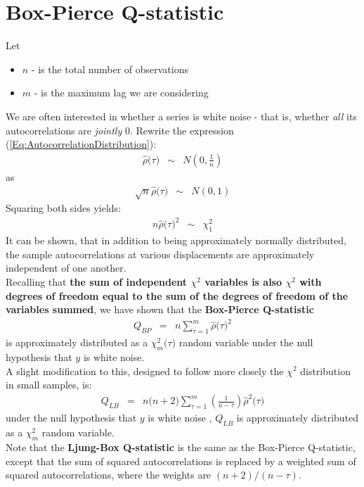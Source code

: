 \section{Box-Pierce Q-statistic}
Let
\begin{itemize}
	\item $n$ - is the total number of observations
	\item $m$ - is the maximum lag we are considering 
\end{itemize}
We are often interested in whether a series is white noise - that is, whether \textit{all} its autocorrelations are \textit{jointly} 0. Rewrite the expression (\ref{Eq:AutocorrelationDistribution}):
\begin{eqnarray}
	\nonumber
	\hat{\rho}\big(\tau\big) &\sim& N\left(0, \frac{1}{n}\right)
\end{eqnarray}
as
\begin{eqnarray}
	\sqrt{n}\hat{\rho}\big(\tau\big) &\sim& N\left(0, 1\right)
\end{eqnarray}
Squaring both sides yields:
\begin{eqnarray}
	n\hat{\rho}\big(\tau\big)^{2} &\sim& \chi_{1}^{2}
\end{eqnarray}
It can be shown, that in addition to being approximately normally distributed, the sample autocorrelations at various displacements are approximately independent of one another.\\
Recalling that \textbf{\color{blue}the sum of independent $\chi^{2}$ variables is also $\chi^{2}$ with degrees of freedom equal to the sum of the degrees of freedom of the variables summed}, we have shown that the \textbf{\color{blue}Box-Pierce Q-statistic}
\begin{eqnarray}
	Q_{BP} &=& n\sum_{\tau = 1}^{m}\hat{\rho}\big(\tau\big)^{2}
\end{eqnarray}
is approximately distributed as a $\chi_{m}^{2}\big(\tau\big)$ random variable under the null hypothesis that $y$ is white noise.\\
A slight modification to this, designed to follow more closely the $\chi^{2}$ distribution in small samples, is:
\begin{eqnarray}
	Q_{LB} &=& n\big(n + 2\big)\sum_{\tau = 1}^{m}\left(\frac{1}{n - \tau}\right)\hat{\rho}^{2}\big(\tau\big)
\end{eqnarray}
under the null hypothesis that $y$ is white noise , $Q_{LB}$ is approximately distributed as a $\chi_{m}^{2}$ random variable.\\
Note that the \textbf{\color{blue}Ljung-Box Q-statistic} is the same as the Box-Pierce Q-statistic, except that the sum of squared autocorrelations is replaced by a weighted sum of squared autocorrelations, where the weights are $(n + 2)/ (n - \tau)$.\\
